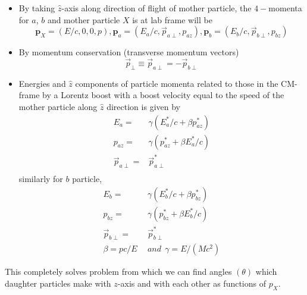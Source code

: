 \begin{itemize}
    \item 
By taking  $\hat{z}$-axis along direction of flight of mother particle, the $4-$momenta for  $a$, $b$ and  mother particle $X$ is at lab frame will be 
        \begin{equation}
            \textbf{p}_{X} = (E/c,0,0,p), \textbf{p}_{a}= (E_{a}/c, \Vec{p}_{a\perp}, p_{a z}), \textbf{p}_{b}= (E_{b}/c, \Vec{p}_{b\perp}, p_{b z})
        \end{equation}
\item        
By momentum conservation (transverse momentum vectors)
        \begin{equation}
            \Vec{p}_\perp \equiv \Vec{p}_{a\perp} =  -\Vec{p}_{b\perp} 
        \end{equation}
\item
Energies and $\hat{z}$ components of particle momenta
related to those in the CM-frame by a Lorentz boost
with a boost velocity equal to the speed of the mother particle along $\hat{z}$ direction is given by         
    \begin{equation}
    \begin{split}
                E_{a} =& \gamma (E^{*}_a/c + \beta p^{*}_{a z})\\
                p_{a z} =& \gamma (p^{*}_{a z}+\beta E_{a}^{*}/c)\\
                \Vec{p}_{a\perp} =& \Vec{p}_{a\perp}^{*}\\
    \end{split}
    \end{equation}
similarly for $b$ particle, 
    \begin{equation}
    \begin{split}
                E_{b} =& \gamma (E^{*}_b/c + \beta p^{*}_{b z})\\
                p_{b z} =& \gamma (p^{*}_{b z}+\beta E_{b}^{*}/c)\\
                \Vec{p}_{b\perp} =& \Vec{p}_{b\perp}^{*}\\
                \beta = p c/ E  \  \ &and  \ \ \gamma = E/ (M c^{2}) 
    \end{split}
    \end{equation}
\end{itemize}

\noindent    
This completely solves problem
from which we can find angles $(\theta)$ which daughter particles
make with $z$-axis and with each other as functions of $p_{X}$.

